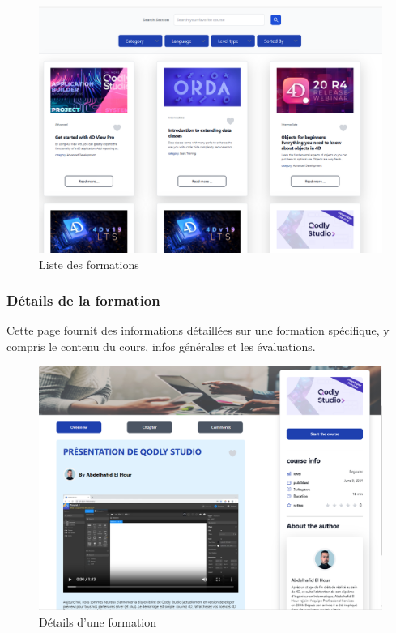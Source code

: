 \begin{figure}[H]
    \centering
    \includegraphics[width=19cm]{Figures/formations.png}
    \caption{Liste des formations}
\end{figure}

\subsubsection{Détails de la formation}

Cette page fournit des informations détaillées sur une formation spécifique, y compris le contenu du cours, infos générales et les évaluations.

\begin{figure}[H]
    \centering
    \includegraphics[width=19cm]{Figures/formation.png}
    \caption{Détails d'une formation}
\end{figure}

